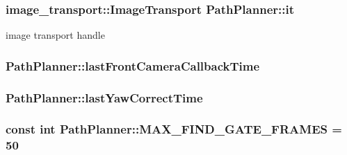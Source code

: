 \subsubsection[{\texorpdfstring{it}{it}}]{\setlength{\rightskip}{0pt plus 5cm}image\+\_\+transport\+::\+Image\+Transport Path\+Planner\+::it}\hypertarget{classPathPlanner_afdf6f6e68086d7992206f84d37b56c84}{}\label{classPathPlanner_afdf6f6e68086d7992206f84d37b56c84}


image transport handle 

\subsubsection[{\texorpdfstring{last\+Front\+Camera\+Callback\+Time}{lastFrontCameraCallbackTime}}]{ Path\+Planner\+::last\+Front\+Camera\+Callback\+Time}\hypertarget{classPathPlanner_aec7cfd25a48b711818991f5f449a050b}{}\label{classPathPlanner_aec7cfd25a48b711818991f5f449a050b}
\subsubsection[{\texorpdfstring{last\+Yaw\+Correct\+Time}{lastYawCorrectTime}}]{ Path\+Planner\+::last\+Yaw\+Correct\+Time}\hypertarget{classPathPlanner_a5b503e6eba34d4925b07749f3162f659}{}\label{classPathPlanner_a5b503e6eba34d4925b07749f3162f659}
\subsubsection[{\texorpdfstring{M\+A\+X\+\_\+\+F\+I\+N\+D\+\_\+\+G\+A\+T\+E\+\_\+\+F\+R\+A\+M\+ES}{MAX_FIND_GATE_FRAMES}}]{\setlength{\rightskip}{0pt plus 5cm}const int Path\+Planner\+::\+M\+A\+X\+\_\+\+F\+I\+N\+D\+\_\+\+G\+A\+T\+E\+\_\+\+F\+R\+A\+M\+ES = 50}\hypertarget{classPathPlanner_ada301b950a4d1b14acd2477fbc5f73df}{}\label{classPathPlanner_ada301b950a4d1b14acd2477fbc5f73df}
